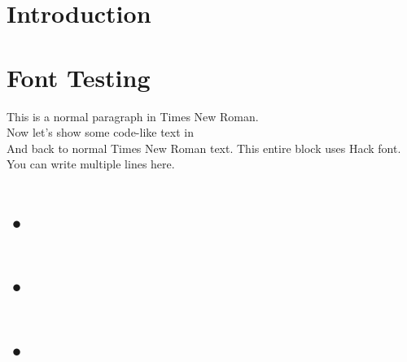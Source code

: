 \documentclass[12pt]{article}
\begin{document}
\tableofcontents
\thispagestyle{empty}
\clearpage
{}

\section*{Introduction}

\section{Font Testing}
This is a normal paragraph in Times New Roman. \\
Now let's show some code-like text in  \\
And back to normal Times New Roman text.
{\hackfont
This entire block uses Hack font. \\
You can write multiple lines here.
}

\section{•}

\section{•}

\section{•}
\end{document}

